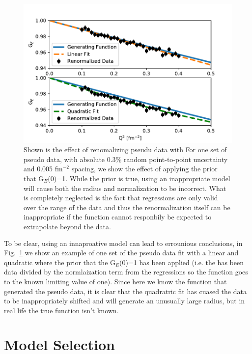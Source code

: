 \documentclass[10pt,aps,prc,twocolumn]{revtex4-1}
\begin{document}
\begin{figure}[htb]
\label{linearVSquadratic}
\includegraphics[width=\columnwidth]{Figure/linearVSquadratic.pdf}
\caption{Shown is the effect of renomalizing pseudu data with 
For one set of pseudo data, with absolute 0.3\% random point-to-point uncertainty and 0.005 fm$^{-2}$ spacing,
we show the effect of applying the prior that G$_E$(0)=1.   While the prior is true, using an inappropriate model
will cause both the radius and normalization to be incorrect.   What is completely neglected is the fact that 
regressions are only valid over the range of the data and thus the renormalization itself can be inappropriate
if the function cannot responbily be expected to extrapolate beyond the data.}
\end{figure}

To be clear, using an innaproative model can lead to errounious conclusions, 
in Fig.~\ref{linearVSquadratic} we show an
example of one set of the pseudo data fit with a linear and quadratic where the prior that the
G$_E$(0)=1 has been applied (i.e. the has been data divided by the normlaization term from the regressions
so the function goes to the known limiting value of one).
Since here we know the function that generated the pseudo data, it is clear that the quadratric
fit has cuased the data to be inappropriately shifted and will generate an unusually large radius, 
but in real life the true function isn't known.



\section{Model Selection}
\end{document}
